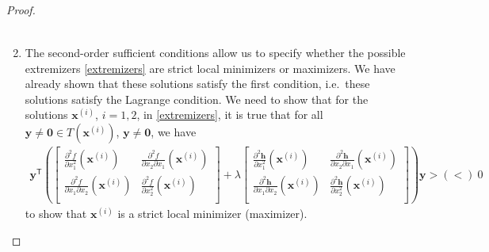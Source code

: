 \documentclass[12pt]{article}
\theoremstyle{definition}
\newcommand{\vc}[1]{\boldsymbol{#1}}
\newcommand{\tran}{\mathsf{T}}
\begin{document}
\begin{proof}
\begin{enumerate}
\begin{align}
      \end{align}
    \item The second-order sufficient conditions allow us to specify whether
      the possible extremizers \eqref{extremizers} are strict local minimizers or maximizers.
      We have already shown that these solutions satisfy the first condition, i.e.\ these solutions satisfy the Lagrange condition.
      We need to show that for the solutions $\vc{x}^{(i)}$, $i=1,2$, in \eqref{extremizers}, it is true that
      for all $\vc{y}  \neq \vc{0} \in T(\vc{x}^{(i)})$, $\vc{y}\neq \vc{0}$, we have
      \begin{align*}
        \vc{y}^\tran \left(
          \begin{bmatrix}
            \frac{\partial^2 f}{\partial x_1^2}(\vc{x}^{(i)}) & \frac{\partial^2 f}{\partial x_2\partial x_1}(\vc{x}^{(i)}) \\
            \frac{\partial^2 f}{\partial x_1\partial x_2}(\vc{x}^{(i)}) & \frac{\partial^2 f}{\partial x_2^2}(\vc{x}^{(i)}) \\
          \end{bmatrix} + \lambda
          \begin{bmatrix}
            \frac{\partial^2 \vc{h}}{\partial x_1^2}(\vc{x}^{(i)}) & \frac{\partial^2 \vc{h}}{\partial x_2\partial x_1}(\vc{x}^{(i)}) \\
            \frac{\partial^2 \vc{h}}{\partial x_1\partial x_2}(\vc{x}^{(i)}) & \frac{\partial^2 \vc{h}}{\partial x_2^2}(\vc{x}^{(i)}) \\
          \end{bmatrix}
        \right) \vc{y} > (<)\ 0
      \end{align*}
      to show that $\vc{x}^{(i)}$ is a strict local minimizer (maximizer).


\end{enumerate}
\end{proof}
\end{document}
